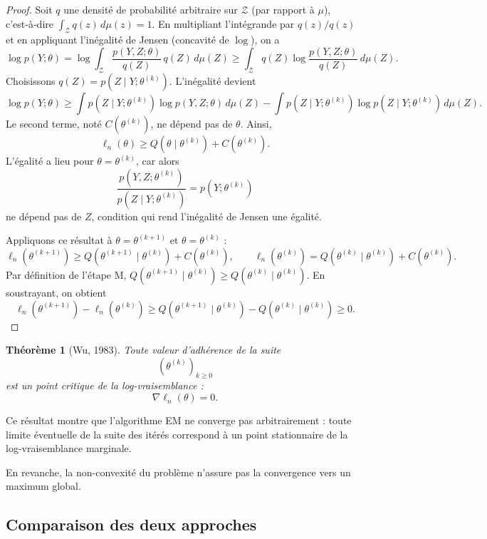 \documentclass[12pt, a4paper]{article}
\newtheorem{theorem}{Théorème}[section]
\theoremstyle{definition}
\begin{document}
\begin{proof}
Soit $q$ une densité de probabilité arbitraire sur $\mathcal{Z}$ (par rapport à $\mu$), c’est‑à‑dire $\int_{\mathcal{Z}} q(z)\,d\mu(z)=1$. En multipliant l’intégrande par $q(z)/q(z)$ et en appliquant l’inégalité de Jensen (concavité de $\log$), on a
\[
\log p(Y;\theta) = \log \int_{\mathcal{Z}} \frac{p(Y,Z;\theta)}{q(Z)}\, q(Z)\,d\mu(Z)
\ge \int_{\mathcal{Z}} q(Z) \log\frac{p(Y,Z;\theta)}{q(Z)}\,d\mu(Z).
\]
Choisissons $q(Z) = p(Z\mid Y;\theta^{(k)})$. L’inégalité devient
\[
\log p(Y;\theta) \ge \int p(Z\mid Y;\theta^{(k)}) \log p(Y,Z;\theta)\,d\mu(Z)
- \int p(Z\mid Y;\theta^{(k)}) \log p(Z\mid Y;\theta^{(k)})\,d\mu(Z).
\]
Le second terme, noté $C(\theta^{(k)})$, ne dépend pas de $\theta$. Ainsi,
\[
\ell_n(\theta) \ge Q(\theta\mid\theta^{(k)}) + C(\theta^{(k)}).
\]
L’égalité a lieu pour $\theta = \theta^{(k)}$, car alors
\[
\frac{p(Y,Z;\theta^{(k)})}{p(Z\mid Y;\theta^{(k)})} = p(Y;\theta^{(k)})
\]
ne dépend pas de $Z$, condition qui rend l’inégalité de Jensen une égalité.

Appliquons ce résultat à $\theta = \theta^{(k+1)}$ et $\theta = \theta^{(k)}$ :
\[
\ell_n(\theta^{(k+1)}) \ge Q(\theta^{(k+1)}\mid\theta^{(k)}) + C(\theta^{(k)}), \qquad
\ell_n(\theta^{(k)}) = Q(\theta^{(k)}\mid\theta^{(k)}) + C(\theta^{(k)}).
\]
Par définition de l’étape M, $Q(\theta^{(k+1)}\mid\theta^{(k)}) \ge Q(\theta^{(k)}\mid\theta^{(k)})$. En soustrayant, on obtient
\[
\ell_n(\theta^{(k+1)}) - \ell_n(\theta^{(k)}) \ge Q(\theta^{(k+1)}\mid\theta^{(k)}) - Q(\theta^{(k)}\mid\theta^{(k)}) \ge 0.
\]
\end{proof}


\begin{theorem}[Wu, 1983]
Toute valeur d’adhérence de la suite
\[
(\theta^{(k)})_{k\geq0}
\]
est un point critique de la log-vraisemblance :
\[
\nabla\ell_n(\theta)=0.
\]
\end{theorem}

Ce résultat montre que l’algorithme EM ne converge pas arbitrairement : toute limite éventuelle de la suite des itérés correspond à un point stationnaire de la log-vraisemblance marginale.

En revanche, la non-convexité du problème n’assure pas la convergence vers un maximum global.

\subsection{Comparaison des deux approches}
\label{subsec:comparaison}
\end{document}
